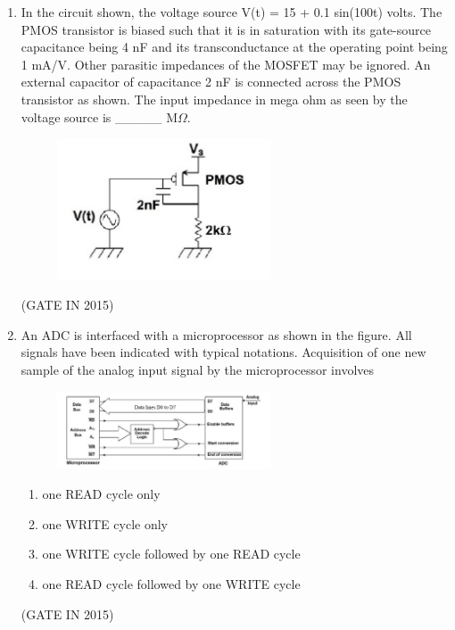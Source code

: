 \documentclass[journal]{IEEEtran}
\begin{document}
\begin{enumerate}
\item In the circuit shown, the voltage source V(t) = 15 + 0.1 sin(100t) volts. The PMOS transistor is biased such that it is in saturation with its gate-source capacitance being 4 nF and its transconductance at the operating point being 1 mA/V. Other parasitic impedances of the MOSFET may be ignored. An external capacitor of capacitance 2 nF is connected across the PMOS transistor as shown. The input impedance in mega ohm as seen by the voltage source is \_\_\_\_\_ M$\Omega$.
\begin{figure}[H]
    \centering
      \includegraphics[width=0.6\textwidth]{22.png} 
      \caption{}
    \label{fig:fig22} 
\end{figure}
 \hfill(GATE IN 2015)

\item An ADC is interfaced with a microprocessor as shown in the figure. All signals have been indicated with typical notations. Acquisition of one new sample of the analog input signal by the microprocessor involves
\begin{figure}[H]
    \centering
      \includegraphics[width=0.6\textwidth]{23.png} 
      \caption{}
    \label{fig:fig23} 
\end{figure}
\begin{enumerate}
\item one READ cycle only
\item one WRITE cycle only
\item one WRITE cycle followed by one READ cycle
\item one READ cycle followed by one WRITE cycle
\end{enumerate}
\hfill(GATE IN 2015)


\end{enumerate}
\end{document}
